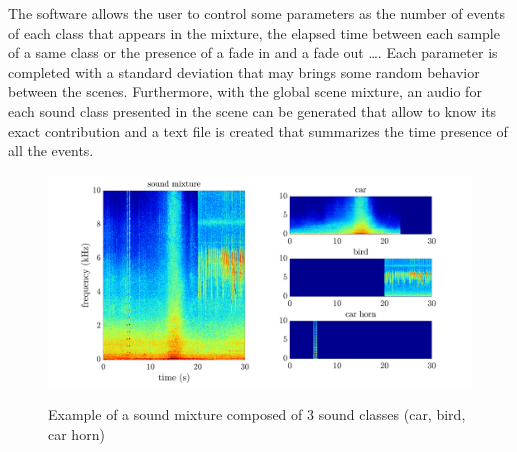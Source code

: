 \documentclass[twocolumn,a4paper,10pt]{article}
\begin{document}
The software allows the user to control some parameters as the number of events of each class that appears in the mixture, the elapsed time between each sample of a same class or the presence of a fade in and a fade out \dots. Each parameter is completed with a standard deviation that may brings some random behavior between the scenes. Furthermore, with the global scene mixture, an audio for each sound class presented in the scene can be generated that allow to know its exact contribution and a text file is created that summarizes the time presence of all the events.\\

\begin{figure}[h]
\centering
\includegraphics[width=\linewidth]{../image/exampleSimScene2.pdf} 
\label{fig:exampleSimScene}
\caption{Example of a sound mixture composed of 3 sound classes (car, bird, car horn)}
\end{figure}
\end{document}
